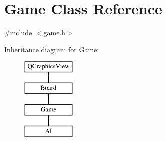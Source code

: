 \hypertarget{class_game}{\section{Game Class Reference}
\label{class_game}
}


{\ttfamily \#include $<$game.\-h$>$}

Inheritance diagram for Game\-:\begin{figure}[H]
\begin{center}
\leavevmode
\includegraphics[height=4.000000cm]{class_game}
\end{center}
\end{figure}

